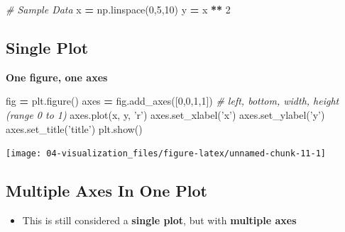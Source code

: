 \documentclass[
]{book}
\newenvironment{Shaded}{\begin{snugshade}}{\end{snugshade}}
\newcommand{\CommentTok}[1]{\textcolor[rgb]{0.37,0.37,0.37}{\textit{#1}}}
\newcommand{\DecValTok}[1]{\textcolor[rgb]{0.06,0.06,0.06}{#1}}
\newcommand{\NormalTok}[1]{#1}
\newcommand{\OperatorTok}[1]{\textcolor[rgb]{0.43,0.43,0.43}{\textbf{#1}}}
\newcommand{\StringTok}[1]{\textcolor[rgb]{0.5,0.5,0.5}{#1}}
\providecommand{\tightlist}{%
  \setlength{\itemsep}{0pt}\setlength{\parskip}{0pt}}
\begin{document}
\begin{Shaded}
\begin{Highlighting}[]
\CommentTok{# Sample Data}
\NormalTok{x }\OperatorTok{=}\NormalTok{ np.linspace(}\DecValTok{0}\NormalTok{,}\DecValTok{5}\NormalTok{,}\DecValTok{10}\NormalTok{)}
\NormalTok{y }\OperatorTok{=}\NormalTok{ x }\OperatorTok{**} \DecValTok{2}
\end{Highlighting}
\end{Shaded}

\hypertarget{single-plot-1}{%
\subsection{Single Plot}\label{single-plot-1}}

\textbf{One figure, one axes}

\begin{Shaded}
\begin{Highlighting}[]
\NormalTok{fig }\OperatorTok{=}\NormalTok{ plt.figure()}
\NormalTok{axes }\OperatorTok{=}\NormalTok{ fig.add_axes([}\DecValTok{0}\NormalTok{,}\DecValTok{0}\NormalTok{,}\DecValTok{1}\NormalTok{,}\DecValTok{1}\NormalTok{]) }\CommentTok{# left, bottom, width, height (range 0 to 1)}
\NormalTok{axes.plot(x, y, }\StringTok{'r'}\NormalTok{)}
\NormalTok{axes.set_xlabel(}\StringTok{'x'}\NormalTok{)}
\NormalTok{axes.set_ylabel(}\StringTok{'y'}\NormalTok{)}
\NormalTok{axes.set_title(}\StringTok{'title'}\NormalTok{)}
\NormalTok{plt.show()}
\end{Highlighting}
\end{Shaded}

\texttt{[image: 04-visualization\_files/figure-latex/unnamed-chunk-11-1]}

\hypertarget{multiple-axes-in-one-plot}{%
\subsection{Multiple Axes In One Plot}\label{multiple-axes-in-one-plot}}

\begin{itemize}
\tightlist
\item
  This is still considered a \textbf{single plot}, but with \textbf{multiple axes}
\end{itemize}
\end{document}
